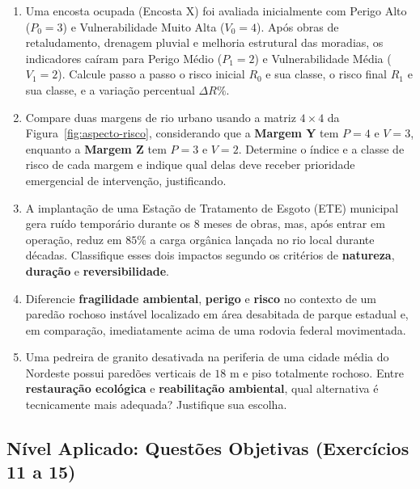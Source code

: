 \begin{enumerate}[leftmargin=1.8em, itemsep=4pt, resume]
  \item Uma encosta ocupada (Encosta X) foi avaliada inicialmente com Perigo Alto ($P_0 = 3$) e Vulnerabilidade Muito Alta ($V_0 = 4$). Após obras de retaludamento, drenagem pluvial e melhoria estrutural das moradias, os indicadores caíram para Perigo Médio ($P_1 = 2$) e Vulnerabilidade Média ($V_1 = 2$). Calcule passo a passo o risco inicial $R_0$ e sua classe, o risco final $R_1$ e sua classe, e a variação percentual $\Delta R\%$.
  \espacoResolucao[2.8cm]

  \item Compare duas margens de rio urbano usando a matriz $4 \times 4$ da Figura~\ref{fig:aspecto-risco}, considerando que a \textbf{Margem Y} tem $P = 4$ e $V = 3$, enquanto a \textbf{Margem Z} tem $P = 3$ e $V = 2$. Determine o índice e a classe de risco de cada margem e indique qual delas deve receber prioridade emergencial de intervenção, justificando.
  \espacoResolucao[2.3cm]

  \item A implantação de uma Estação de Tratamento de Esgoto (ETE) municipal gera ruído temporário durante os 8 meses de obras, mas, após entrar em operação, reduz em $85\%$ a carga orgânica lançada no rio local durante décadas. Classifique esses dois impactos segundo os critérios de \textbf{natureza}, \textbf{duração} e \textbf{reversibilidade}.
  \espacoResolucao[2.3cm]

  \item Diferencie \textbf{fragilidade ambiental}, \textbf{perigo} e \textbf{risco} no contexto de um paredão rochoso instável localizado em área desabitada de parque estadual e, em comparação, imediatamente acima de uma rodovia federal movimentada.
  \espacoResolucao[2.3cm]

  \item Uma pedreira de granito desativada na periferia de uma cidade média do Nordeste possui paredões verticais de $18\text{ m}$ e piso totalmente rochoso. Entre \textbf{restauração ecológica} e \textbf{reabilitação ambiental}, qual alternativa é tecnicamente mais adequada? Justifique sua escolha.
  \espacoResolucao[2.3cm]
\end{enumerate}

\subsection*{Nível Aplicado: Questões Objetivas (Exercícios 11 a 15)}


